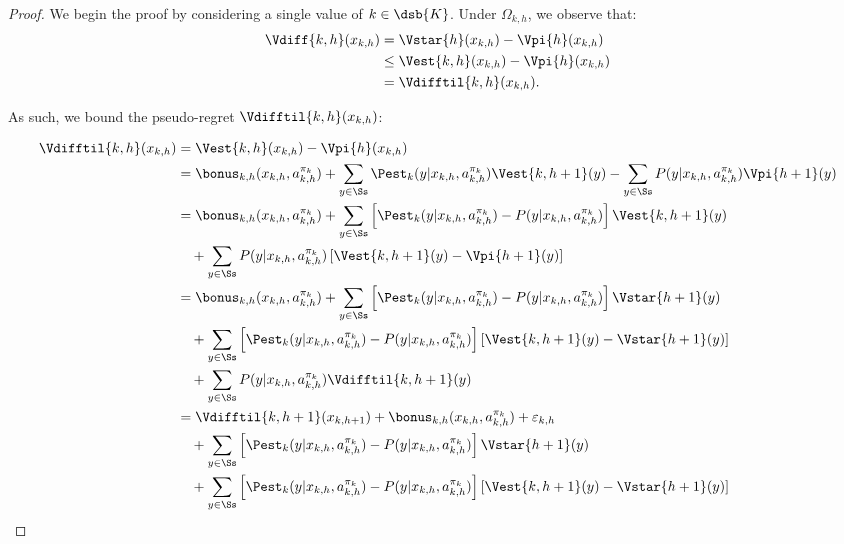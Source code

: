 \begin{proof}
We begin the proof by considering a single value of $k \in \dsb{K}$. Under $\Omega_{k,h}$, we observe that:
\begin{align}
    \Vdiff{k,h}(x_{k,h}) &= \Vstar{h}(x_{k,h}) - \Vpi{h}(x_{k,h}) \nonumber \\
    &\le \Vest{k,h}(x_{k,h}) - \Vpi{h}(x_{k,h}) \nonumber \\
    &= \Vdifftil{k,h}(x_{k,h}). \nonumber
\end{align}

As such, we bound the pseudo-regret $\Vdifftil{k,h}(x_{k,h})$:

\begin{align}
    \Vdifftil{k,h}(x_{k,h}) &= \Vest{k,h}(x_{k,h}) - \Vpi{h}(x_{k,h}) \nonumber \\
    &= \bonus_{k,h}(x_{k,h}, a_{k,h}^{\pi_k}) + \sum_{y \in \Ss} \Pest_k (y | x_{k,h}, a_{k,h}^{\pi_k}) \Vest{k,h+1}(y) - \sum_{y \in \Ss} P(y | x_{k,h}, a_{k,h}^{\pi_k}) \Vpi{h+1}(y) \nonumber \\
    &= \bonus_{k,h}(x_{k,h}, a_{k,h}^{\pi_k}) + \sum_{y \in \Ss} \left[ \Pest_k (y | x_{k,h}, a_{k,h}^{\pi_k}) - P(y | x_{k,h}, a_{k,h}^{\pi_k}) \right] \Vest{k,h+1}(y) \nonumber \\
    &\quad + \sum_{y \in \Ss} P(y | x_{k,h}, a_{k,h}^{\pi_k}) \left[ \Vest{k,h+1}(y) - \Vpi{h+1}(y) \right] \nonumber \\
    &= \bonus_{k,h}(x_{k,h}, a_{k,h}^{\pi_k}) + \sum_{y \in \Ss} \left[ \Pest_k (y | x_{k,h}, a_{k,h}^{\pi_k}) - P(y | x_{k,h}, a_{k,h}^{\pi_k}) \right] \Vstar{h+1} (y) \nonumber \\
    &\quad + \sum_{y \in \Ss} \left[ \Pest_k (y | x_{k,h}, a_{k,h}^{\pi_k}) - P(y | x_{k,h}, a_{k,h}^{\pi_k}) \right] \left[ \Vest{k, h+1}(y) - \Vstar{h+1}(y) \right] \nonumber \\
    &\quad + \sum_{y \in \Ss} P(y | x_{k,h}, a_{k,h}^{\pi_k}) \Vdifftil{k, h+1}(y) \nonumber \\
    &= \Vdifftil{k,h+1}(x_{k,h+1}) + \bonus_{k,h}(x_{k,h}, a_{k,h}^{\pi_k}) + \varepsilon_{k,h} \label{lem:regr_dec:1} \\
    &\quad + \sum_{y \in \Ss} \left[ \Pest_k (y | x_{k,h}, a_{k,h}^{\pi_k}) - P(y | x_{k,h}, a_{k,h}^{\pi_k}) \right] \Vstar{h+1} (y) \nonumber \\
    &\quad + \sum_{y \in \Ss} \left[ \Pest_k (y | x_{k,h}, a_{k,h}^{\pi_k}) - P(y | x_{k,h}, a_{k,h}^{\pi_k}) \right] \left[ \Vest{k, h+1}(y) - \Vstar{h+1}(y) \right] \nonumber \\

\end{align}
\end{proof}
